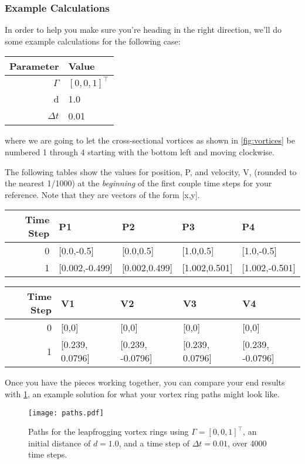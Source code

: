 \documentclass{article}
\begin{document}
\clearpage
\newpage

\subsubsection*{Example Calculations}

In order to help you make sure you're heading in the right direction, we'll do some example calculations for the following case:

\renewcommand{\arraystretch}{1.5}
\begin{tabular}{r | l}
	Parameter & Value \\
	\hline
	$\Gamma$ & $[0,0,1]^\top$ \\
	d & 1.0 \\
	$\Delta t$ & 0.01
\end{tabular}

\noindent where we are going to let the cross-sectional vortices as shown in \cref{fig:vortices} be numbered 1 through 4 starting with the bottom left and moving clockwise.

The following tables show the values for position, P, and velocity, V, (rounded to the nearest 1/1000) at the \textit{beginning} of the first couple time steps for your reference. Note that they are vectors of the form [x,y].

\renewcommand{\arraystretch}{1.5}
\begin{tabular}{r | l | l | l | l }
	Time Step & P1 & P2 & P3 & P4  \\
	\hline
	0  & [0.0,-0.5] & [0.0,0.5] & [1.0,0.5] & [1.0,-0.5]   \\
	1 & [0.002,-0.499] & [0.002,0.499] & [1.002,0.501] & [1.002,-0.501]
\end{tabular}

\bigskip

\renewcommand{\arraystretch}{1.5}
\begin{tabular}{r | l | l | l | l  }
	Time Step & V1 & V2 & V3 & V4 \\
	\hline
	0   & [0,0] & [0,0] & [0,0] & [0,0]  \\
	1 & [0.239, 0.0796] & [0.239, -0.0796] & [0.239, 0.0796] & [0.239, -0.0796]
\end{tabular}

Once you have the pieces working together, you can compare your end results with \cref{fig:vortexpaths}, an example solution for what your vortex ring paths might look like.

\begin{figure}[htb]
	\centering
	\texttt{[image: paths.pdf]}
	\caption{Paths for the leapfrogging vortex rings using $\Gamma = [0,0,1]^\top$, an initial distance of $d=1.0$, and a time step of $\Delta t =0.01$, over 4000 time steps.}
	\label{fig:vortexpaths}
\end{figure}
\end{document}
